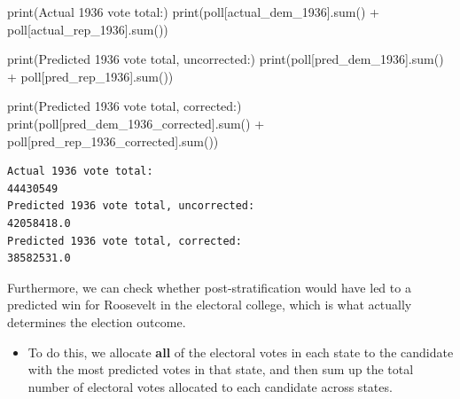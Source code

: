 \documentclass[
  letterpaper,
  DIV=11,
  numbers=noendperiod]{scrreprt}
\newenvironment{Shaded}{\begin{snugshade}}{\end{snugshade}}
\newcommand{\BuiltInTok}[1]{\textcolor[rgb]{0.00,0.23,0.31}{#1}}
\newcommand{\NormalTok}[1]{\textcolor[rgb]{0.00,0.23,0.31}{#1}}
\newcommand{\OperatorTok}[1]{\textcolor[rgb]{0.37,0.37,0.37}{#1}}
\newcommand{\StringTok}[1]{\textcolor[rgb]{0.13,0.47,0.30}{#1}}
\providecommand{\tightlist}{%
  \setlength{\itemsep}{0pt}\setlength{\parskip}{0pt}}\usepackage{longtable,booktabs,array}
\begin{document}
\begin{Shaded}
\begin{Highlighting}[]
\BuiltInTok{print}\NormalTok{(}\StringTok{\textquotesingle{}Actual 1936 vote total:\textquotesingle{}}\NormalTok{)}
\BuiltInTok{print}\NormalTok{(poll[}\StringTok{\textquotesingle{}actual\_dem\_1936\textquotesingle{}}\NormalTok{].}\BuiltInTok{sum}\NormalTok{() }\OperatorTok{+}\NormalTok{ poll[}\StringTok{\textquotesingle{}actual\_rep\_1936\textquotesingle{}}\NormalTok{].}\BuiltInTok{sum}\NormalTok{())}

\BuiltInTok{print}\NormalTok{(}\StringTok{\textquotesingle{}Predicted 1936 vote total, uncorrected:\textquotesingle{}}\NormalTok{)}
\BuiltInTok{print}\NormalTok{(poll[}\StringTok{\textquotesingle{}pred\_dem\_1936\textquotesingle{}}\NormalTok{].}\BuiltInTok{sum}\NormalTok{() }\OperatorTok{+}\NormalTok{ poll[}\StringTok{\textquotesingle{}pred\_rep\_1936\textquotesingle{}}\NormalTok{].}\BuiltInTok{sum}\NormalTok{())}

\BuiltInTok{print}\NormalTok{(}\StringTok{\textquotesingle{}Predicted 1936 vote total, corrected:\textquotesingle{}}\NormalTok{)}
\BuiltInTok{print}\NormalTok{(poll[}\StringTok{\textquotesingle{}pred\_dem\_1936\_corrected\textquotesingle{}}\NormalTok{].}\BuiltInTok{sum}\NormalTok{() }\OperatorTok{+}\NormalTok{ poll[}\StringTok{\textquotesingle{}pred\_rep\_1936\_corrected\textquotesingle{}}\NormalTok{].}\BuiltInTok{sum}\NormalTok{())}
\end{Highlighting}
\end{Shaded}

\begin{verbatim}
Actual 1936 vote total:
44430549
Predicted 1936 vote total, uncorrected:
42058418.0
Predicted 1936 vote total, corrected:
38582531.0
\end{verbatim}

Furthermore, we can check whether post-stratification would have led to
a predicted win for Roosevelt in the electoral college, which is what
actually determines the election outcome.

\begin{itemize}
\tightlist
\item
  To do this, we allocate \textbf{all} of the electoral votes in each
  state to the candidate with the most predicted votes in that state,
  and then sum up the total number of electoral votes allocated to each
  candidate across states.
\end{itemize}
\end{document}
